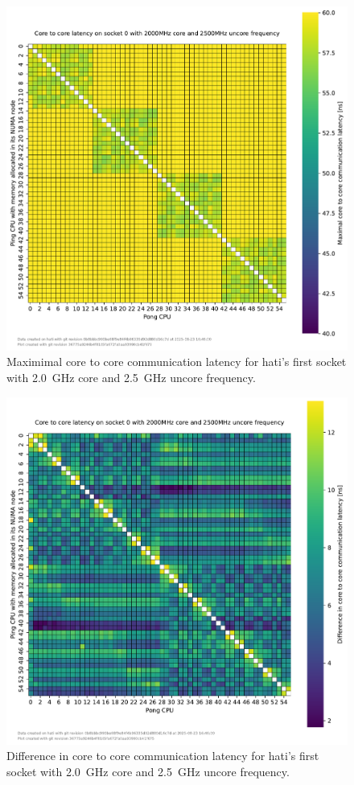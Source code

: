 \begin{figure}[]
    \centering
    \includegraphics[width=\columnwidth]{fig/core-to-core-latency/core-to-core-heatmap-max-2000-2500.pdf}
    \caption{Maximimal core to core communication latency for hati's first socket with \SI{2.0}{\GHz} core and \SI{2.5}{\GHz} uncore frequency.}
\end{figure}
\begin{figure}[]
    \centering
    \includegraphics[width=\columnwidth]{fig/core-to-core-latency/core-to-core-heatmap-diff-2000-2500.pdf}
    \caption{Difference in core to core communication latency for hati's first socket with \SI{2.0}{\GHz} core and \SI{2.5}{\GHz} uncore frequency.}
\end{figure}

